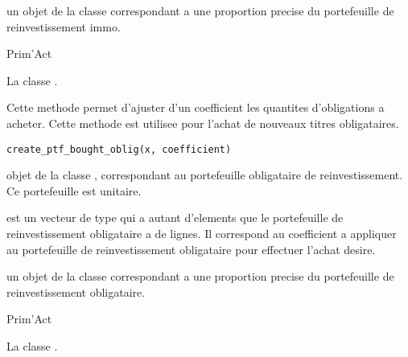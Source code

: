 \documentclass[a4paper]{book}
\begin{document}
%
\begin{Value}
 un objet de la classe  correspondant a une
proportion precise du portefeuille de reinvestissement immo.
\end{Value}
%
\begin{Author}\relax
Prim'Act
\end{Author}
%
\begin{SeeAlso}\relax
La classe .
\end{SeeAlso}
%
\begin{Description}\relax
Cette methode permet d'ajuster d'un coefficient les quantites
d'obligations a acheter. Cette methode est utilisee pour l'achat de nouveaux titres obligataires.
\end{Description}
%
\begin{Usage}
\begin{verbatim}
create_ptf_bought_oblig(x, coefficient)
\end{verbatim}
\end{Usage}
%
\begin{Arguments}
\begin{ldescription}
\item[\code{x}] objet de la classe , correspondant au portefeuille
obligataire de reinvestissement. Ce portefeuille est unitaire.

\item[\code{coefficient}] est un vecteur de type  qui a autant d'elements
que le portefeuille de reinvestissement obligataire a de lignes. Il correspond au coefficient
a appliquer au portefeuille de reinvestissement obligataire pour effectuer l'achat desire.
\end{ldescription}
\end{Arguments}
%
\begin{Value}
 un objet de la classe  correspondant a une proportion
precise du portefeuille de reinvestissement obligataire.
\end{Value}
%
\begin{Author}\relax
Prim'Act
\end{Author}
%
\begin{SeeAlso}\relax
La classe .
\end{SeeAlso}
\end{document}
